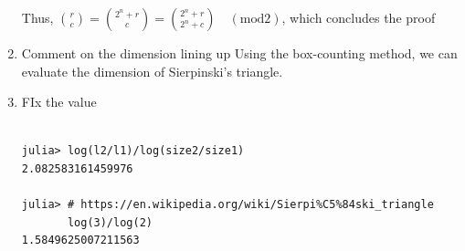 \documentclass[11pt]{article}
\begin{document}
\begin{enumerate}
Thus, \(\binom{r}{c} = \binom{2^n + r}{c} = \binom{2^n + r}{2^n + c} \quad (\text{mod} 2)\), which concludes the proof

\item Comment on the dimension lining up
\label{sec:org0901f02}
Using the box-counting method, we can evaluate the dimension of Sierpinski's triangle.
\item FIx the value
\label{sec:org19d343d}

\begin{verbatim}

julia> log(l2/l1)/log(size2/size1)
2.082583161459976

julia> # https://en.wikipedia.org/wiki/Sierpi%C5%84ski_triangle
       log(3)/log(2)
1.5849625007211563

\end{verbatim}
\end{enumerate}
\end{document}
